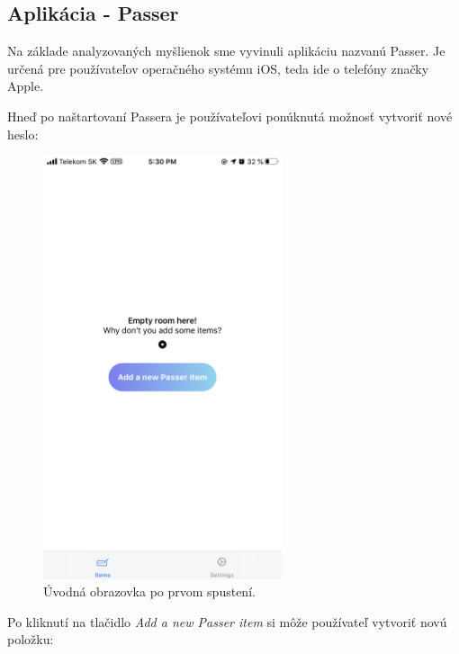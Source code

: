 \subsection{Aplikácia - Passer}
\label{passer}
Na základe analyzovaných myšlienok sme vyvinuli aplikáciu nazvanú Passer. Je určená pre používateľov operačného systému iOS, teda ide o telefóny značky Apple. 

Hneď po naštartovaní Passera je používateľovi ponúknutá možnosť vytvoriť nové heslo: 

\begin{figure}[H]
  \centering
  \includegraphics[width=7cm]{img/passer1.PNG}
  \caption{Úvodná obrazovka po prvom spustení.}
  \label{passer1}
\end{figure}

Po kliknutí na tlačidlo \textit{Add a new Passer item} si môže používateľ vytvoriť novú položku: 


